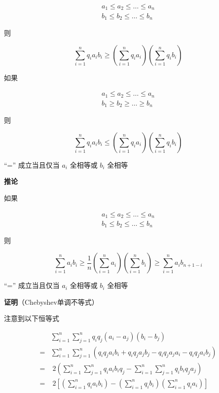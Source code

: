 \[
\begin{aligned}
a_{1}\leq a_{2}\leq\dots\leq a_{n}\\
b_{1}\leq b_{2}\leq \dots \leq b_{n}
\end{aligned}
\]

则

\[
\sum_{i=1}^{n}q_{i}a_{i}b_{i}\geq\left( \sum_{i=1}^{n}q_{i}a_{i} \right)\left( \sum_{i=1}^{n} q_{i}b_{i} \right)
\]

如果

\[
\begin{aligned}
a_{1}\leq a_{2}\leq\dots\leq a_{n}\\
b_{1}\geq b_{2}\geq\dots\geq b_{n}
\end{aligned}
\]

则

\[
\sum_{i=1}^{n}q_{i}a_{i}b_{i}\leq \left( \sum_{i=1}^{n}q_{i}a_{i} \right)\left( \sum_{i=1}^{n}q_{i}b_{i} \right)
\]

``='' 成立当且仅当 \(a_{i}\) 全相等或 \(b_{i}\) 全相等

\textbf{推论}

如果

\[
\begin{aligned}
a_{1}\leq a_{2}\leq\dots\leq a_{n}\\
b_{1}\leq b_{2}\leq\dots\leq b_{n}
\end{aligned}
\]

则

\[
\sum_{i=1}^{n}a_{i}b_{i}\geq \frac{1}{n}\left( \sum_{i=1}^{n}a_{i} \right)\left( \sum_{i=1}^{n}b_{i} \right)\geq \sum_{i=1}^{n}a_{i}b_{n+1-i}
\]

``='' 成立当且仅当 \(a_i\) 全相等或 \(b_{i}\) 全相等

\textbf{证明}（Chebyshev单调不等式）

注意到以下恒等式

\[
\begin{aligned}
&\sum_{i=1}^{n} \sum_{j=1}^{n} q_{i}q_{j}(a_{i}-a_{j})(b_{i}-b_{j})\\
=& \sum_{i=1}^{n}\sum_{j=1}^{n}(q_{i}q_{j}a_{i}b_{i}+q_{i}q_{j}a_{j}b_{j}-q_{i}q_{j}a_{j}a_{i}-q_{i}q_{j}a_{i}b_{j})\\
=& \;  2\left(\sum_{i=1}^{n}\sum_{j=1}^{n}q_{i}a_{i}b_{i}q_{j} - \sum_{i=1}^{n}\sum_{j=1}^{n}q_{i}b_{i}q_{j}a_{j}\right)\\
=& \;  2\left[\left(\sum_{i=1}^{n}q_{i}a_{i}b_{i}\right) - \left(\sum_{i=1}^{n}q_{i}b_{i}\right)\left(\sum_{i=1}^{n}q_{i}a_{i}\right)\right]\\
\end{aligned}
\]

